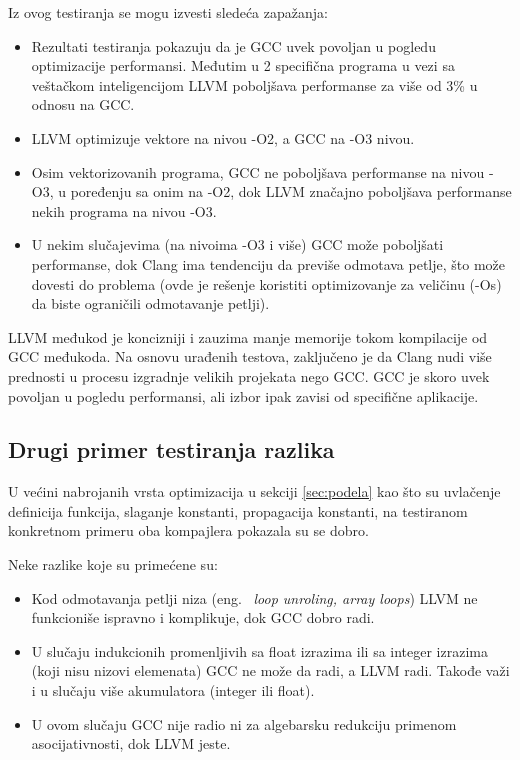 \documentclass[a4paper]{article}
\begin{document}
Iz ovog testiranja se mogu izvesti sledeća zapažanja: 

\begin{itemize} 
\item Rezultati testiranja pokazuju da je GCC uvek povoljan u pogledu optimizacije performansi. 
Međutim u 2 specifična programa u vezi sa veštačkom inteligencijom LLVM poboljšava performanse za više od 3\% u odnosu na GCC. 
\item LLVM optimizuje vektore na nivou -O2,  a GCC na -O3 nivou. 
\item Osim vektorizovanih programa, GCC ne poboljšava performanse na nivou -O3, u poređenju sa onim na -O2, dok LLVM značajno poboljšava performanse nekih programa na nivou -O3. 
\item U nekim slučajevima (na nivoima -O3 i više) GCC može poboljšati performanse, dok Clang ima tendenciju da previše odmotava petlje, što može dovesti do problema (ovde je rešenje koristiti optimizovanje za veličinu (-Os) da biste ograničili odmotavanje petlji).
\end{itemize}

LLVM međukod je koncizniji i zauzima manje memorije tokom kompilacije od GCC međukoda.
Na osnovu urađenih testova, zaključeno je da Clang nudi više prednosti u procesu izgradnje velikih projekata nego GCC. 
GCC je skoro uvek povoljan u pogledu performansi, ali izbor ipak zavisi od specifične aplikacije. \cite{gccVsClang} 

\subsection{Drugi primer testiranja razlika}
\label{subsec:primer1}

U većini nabrojanih  vrsta optimizacija u sekciji \ref{sec:podela} kao što su uvlačenje definicija funkcija, slaganje konstanti, propagacija konstanti, na testiranom konkretnom primeru oba kompajlera pokazala su se dobro.

Neke razlike koje su primećene su: 
\begin{itemize}
\item Kod odmotavanja petlji niza (eng. ~{\em loop unroling, array loops}) LLVM ne funkcioniše ispravno i komplikuje, dok GCC dobro radi. 
\item U slučaju indukcionih promenljivih sa float izrazima  ili sa integer izrazima (koji nisu nizovi elemenata) GCC ne može da radi, a LLVM radi. Takođe važi i u slučaju više akumulatora (integer ili float).
\item U ovom slučaju GCC nije radio ni za algebarsku redukciju primenom asocijativnosti, dok LLVM jeste. \cite{fogOptimizacije}
\end{itemize}
\end{document}
